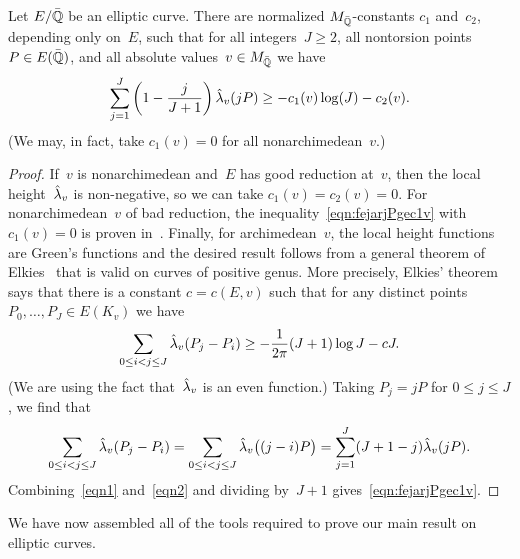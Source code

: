 \documentclass[12pt,reqno]{amsart}
\begin{document}
\begin{proposition}
\label{prop:fourieravg}
Let $E/{\bar{\mathbb{Q}}}$ be an elliptic curve. There are normalized
$M_{{\bar{\mathbb{Q}}}}$-constants $c_1$ and~$c_2$, depending only on~$E$, such
that for all integers~$J\ge2$, all nontorsion points~$P\in E({\bar{\mathbb{Q}}})$,
and all absolute values~$v\in M_{\bar{\mathbb{Q}}}$ we have
\begin{equation}
  \label{eqn:fejarjPgec1v}
  \sum_{j=1}^J \left(1-\frac{j}{J+1}\right)\hat\lambda_v(jP)
  \ge -c_1(v)\log(J)-c_2(v).
\end{equation}
\textup(We may, in fact, take $c_1(v)=0$  for all nonarchimedean~$v$.\textup)
\end{proposition}
\begin{proof}
If~$v$ is nonarchimedean and~$E$ has good reduction at~$v$, then the
local height~$\hat\lambda_v$ is non-negative, so we can take
$c_1(v)=c_2(v)=0$.  For nonarchimedean~$v$ of bad reduction, the
inequality~\eqref{eqn:fejarjPgec1v} with $c_1(v)=0$ is proven
in~\cite{HiSi2}.  Finally, for archimedean~$v$, the local height
functions are Green's functions and the desired result follows from a
general theorem of Elkies~\cite[Theorem~5.1]{LangAT} that is valid on
curves of positive genus. More precisely, Elkies' theorem says that
there is a constant $c=c(E,v)$ such that for any distinct
points~$P_0,\ldots,P_J\in E(K_v)$ we have
\begin{equation}
  \label{eqn1}
  \sum_{0\le i<j\le J}
  \hat\lambda_v(P_j-P_i) \ge -\frac{1}{2\pi}(J+1)\log J - cJ.
\end{equation}
(We are using the fact that~$\hat\lambda_v$ is an even function.)
Taking $P_j=jP$ for $0\le j\le J$, we find that
\begin{equation}
  \label{eqn2}
  \sum_{0\le i<j\le J} \hat\lambda_v(P_j-P_i)
  = \sum_{0\le i<j\le J} \hat\lambda_v\bigl((j-i)P\bigr)
  = \sum_{j=1}^J (J+1-j)\hat\lambda_v(jP).
\end{equation}
Combining~\eqref{eqn1} and~\eqref{eqn2} and dividing by~$J+1$
gives~\eqref{eqn:fejarjPgec1v}.
\end{proof}

We have now assembled all of the tools required to prove our main 
result on elliptic curves.
\end{document}
